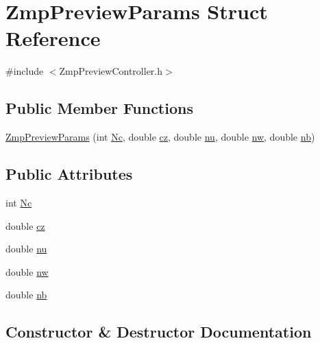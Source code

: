 \hypertarget{structZmpPreviewParams}{}\section{Zmp\+Preview\+Params Struct Reference}
\label{structZmpPreviewParams}


{\ttfamily \#include $<$Zmp\+Preview\+Controller.\+h$>$}

\subsection*{Public Member Functions}
\begin{DoxyCompactItemize}
\item 
\hyperlink{structZmpPreviewParams_a67df1929d83bddb9fb44c9c7846762c6}{Zmp\+Preview\+Params} (int \hyperlink{structZmpPreviewParams_adf022d12c133e9a17a41c1a9864fdef0}{Nc}, double \hyperlink{structZmpPreviewParams_a4bddbdd99f911c9dddfcb2445da1b7dc}{cz}, double \hyperlink{structZmpPreviewParams_a3be5d92df5593e2a7c5694beaf912dac}{nu}, double \hyperlink{structZmpPreviewParams_ae09ca5b74feda7b0af99c07cd7a36c64}{nw}, double \hyperlink{structZmpPreviewParams_abaa39df27b9d8993a940e753b297dcea}{nb})
\end{DoxyCompactItemize}
\subsection*{Public Attributes}
\begin{DoxyCompactItemize}
\item 
int \hyperlink{structZmpPreviewParams_adf022d12c133e9a17a41c1a9864fdef0}{Nc}
\item 
double \hyperlink{structZmpPreviewParams_a4bddbdd99f911c9dddfcb2445da1b7dc}{cz}
\item 
double \hyperlink{structZmpPreviewParams_a3be5d92df5593e2a7c5694beaf912dac}{nu}
\item 
double \hyperlink{structZmpPreviewParams_ae09ca5b74feda7b0af99c07cd7a36c64}{nw}
\item 
double \hyperlink{structZmpPreviewParams_abaa39df27b9d8993a940e753b297dcea}{nb}
\end{DoxyCompactItemize}


\subsection{Constructor \& Destructor Documentation}
\hypertarget{structZmpPreviewParams_a67df1929d83bddb9fb44c9c7846762c6}{}\label{structZmpPreviewParams_a67df1929d83bddb9fb44c9c7846762c6} 

